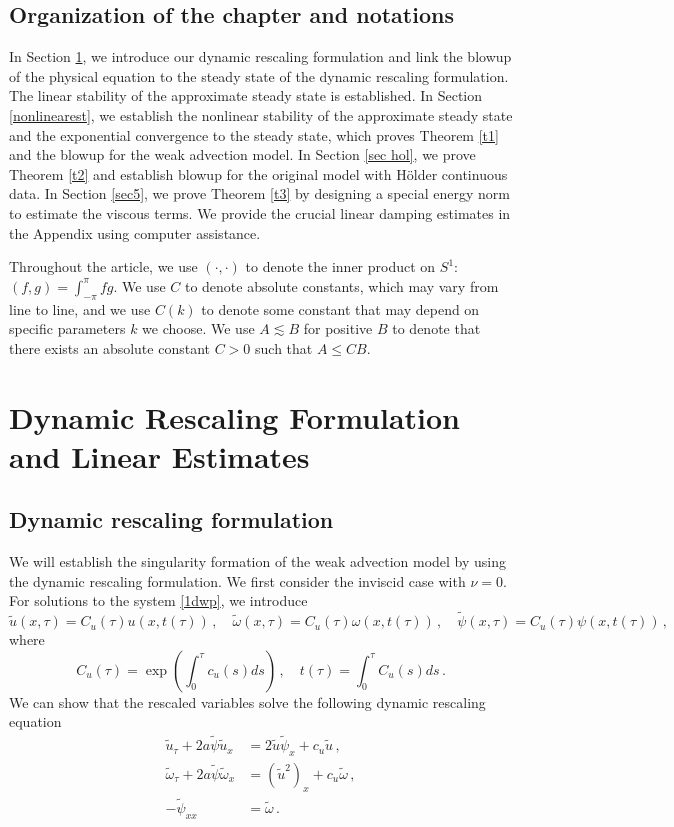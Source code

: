 \documentclass[12pt]{caltech_thesis}
\numberwithin{equation}{section}
\begin{document}
\subsection{Organization of the chapter and notations}
In Section \ref{linearest}, we introduce our dynamic rescaling formulation and link the blowup of the physical equation to the steady state of the dynamic rescaling formulation. The linear stability of the approximate steady state is established.
In Section \ref{nonlinearest}, we establish the nonlinear stability of the approximate steady state and the exponential convergence to the steady state, which proves Theorem \ref{t1} and the blowup for the weak advection model. In Section \ref{sec hol}, we prove Theorem \ref{t2} and establish blowup for the original model with H\"older continuous data. In Section \ref{sec5}, we prove Theorem \ref{t3} by designing a special energy norm to estimate the viscous terms. We provide the crucial linear damping estimates in  the Appendix using computer assistance.

Throughout the article, we use $(\cdot,\cdot)$ to denote the inner product on $S^1$: $(f,g)=\int_{-\pi}^{\pi}fg$. We use $C$ to denote absolute constants, which may vary from line to line, and we use $C(k)$  to denote some constant that may depend on specific parameters $k$  we choose. We use $A\lesssim B$ for positive $B$ to denote that there exists an absolute constant $C>0$ such that $A\leq CB$.
\section{Dynamic Rescaling Formulation and Linear Estimates}
\label{linearest}
\subsection{Dynamic rescaling formulation}
\label{drf sec}
We will establish the singularity formation of the weak advection model by using the dynamic rescaling formulation. We first consider the inviscid case with $\nu=0$. For solutions to the system \eqref{1dwp}, we introduce $$\tilde{u}(x, \tau)=C_{u}(\tau)  u( x, t(\tau))\,,\quad \tilde{\omega}(x, \tau)=C_{u}(\tau)  \omega( x, t(\tau))\,,\quad \tilde{\psi}(x, \tau)=C_{u}(\tau)  \psi(x, t(\tau))\,,$$ where $$
C_{u}(\tau)=\exp \left(\int_{0}^{\tau} c_{u}(s) d s\right)\,, \quad t(\tau)=\int_{0}^{\tau} C_{u}(s) d s\,.$$
We can show that the rescaled variables solve the following dynamic rescaling equation \begin{equation}
\label{1drf}
\begin{aligned}
\tilde{u}_{\tau}+2a \tilde{\psi}\tilde{u}_{ x} &=2 \tilde{u} \tilde{\psi}_{ x}+c_u \tilde{u}\,, \\
\tilde{\omega}_{ \tau}+2a \tilde{\psi}\tilde{\omega}_{ x} &=\left(\tilde{u}^{2}\right)_{x}+c_{u}\tilde{\omega}\,, \\
-\tilde{\psi}_{xx} &=\tilde{\omega}\,.
\end{aligned}
\end{equation}
 
\end{document}
